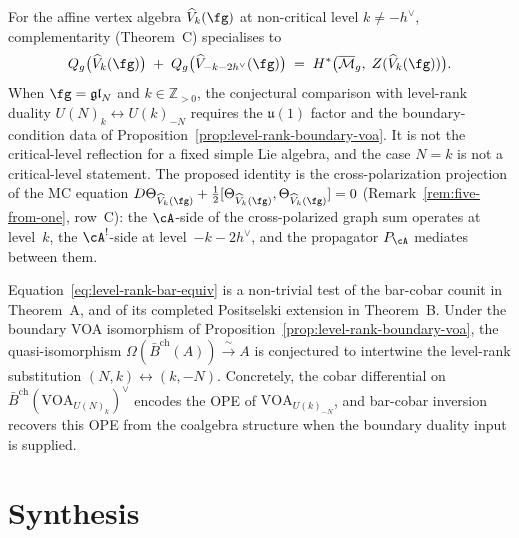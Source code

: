 \begin{conjecture}
\label{conj:level-rank-complementarity}
For the affine vertex algebra $\widehat{V}_k(\fg)$ at non-critical
level $k \neq -h^\vee$, complementarity (Theorem~C) specialises to
\begin{equation}\label{eq:level-rank-complementarity}
 Q_g\bigl(\widehat{V}_k(\fg)\bigr)
 \;+\;
 Q_g\bigl(\widehat{V}_{-k-2h^\vee}(\fg)\bigr)
 \;=\;
 H^*\bigl(\overline{\mathcal{M}}_g,\;
 Z(\widehat{V}_k(\fg))\bigr).
\end{equation}
When $\fg = \mathfrak{gl}_N$ and $k \in \mathbb{Z}_{>0}$, the
conjectural comparison with level-rank duality
$U(N)_k \leftrightarrow U(k)_{-N}$ requires the
$\mathfrak{u}(1)$ factor and the boundary-condition data of
Proposition~\ref{prop:level-rank-boundary-voa}.  It is not the
critical-level reflection for a fixed simple Lie algebra, and the case
$N=k$ is not a critical-level statement.  The proposed identity is the
cross-polarization projection of the MC equation
$D\Theta_{\widehat{V}_k(\fg)} +
\tfrac{1}{2}[\Theta_{\widehat{V}_k(\fg)},
\Theta_{\widehat{V}_k(\fg)}] = 0$
(Remark~\ref{rem:five-from-one}, row~C): the $\cA$-side of the
cross-polarized graph sum operates at level~$k$, the $\cA^!$-side
at level~$-k-2h^\vee$, and the propagator $P_{\cA}$ mediates
between them.
\end{conjecture}

\begin{remark}
\label{rem:level-rank-thm-b-test}
Equation~\eqref{eq:level-rank-bar-equiv} is a non-trivial test of
the bar-cobar counit in Theorem~A, and of its completed Positselski
extension in Theorem~B. Under the boundary VOA isomorphism of
Proposition~\ref{prop:level-rank-boundary-voa}, the quasi-isomorphism
$\Omega(\bar{B}^{\mathrm{ch}}(A)) \xrightarrow{\;\sim\;} A$
is conjectured to intertwine the level-rank substitution
$(N,k) \leftrightarrow (k,-N)$. Concretely, the cobar differential
on $\bar{B}^{\mathrm{ch}}(\mathrm{VOA}_{U(N)_k})^\vee$ encodes
the OPE of $\mathrm{VOA}_{U(k)_{-N}}$, and bar-cobar inversion
recovers this OPE from the coalgebra structure when the boundary
duality input is supplied.
\end{remark}

\section{Synthesis}
\label{sec:km-supplement}

